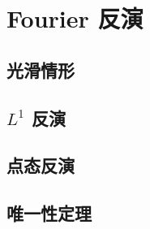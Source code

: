\section{Fourier 反演}
\label{b2:sec:0305}


\subsection{光滑情形}
\label{b2:subsec:030501}

\subsection{\texorpdfstring{\(L^1\)}{L1} 反演}
\label{b2:subsec:030502}

\subsection{点态反演}
\label{b2:subsec:030503}

\subsection{唯一性定理}
\label{b2:subsec:030504}


